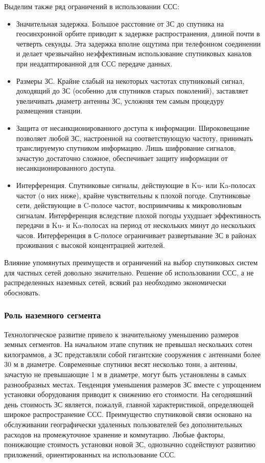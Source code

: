 \documentclass[a4paper]{report}
\begin{document}
Выделим также ряд ограничений в использовании ССС:

\begin{itemize}
\item Значительная задержка. Большое расстояние от ЗС до спутника на геосинхронной орбите приводит к задержке распространения, длиной почти в четверть секунды. Эта задержка вполне ощутима при телефонном соединении и делает чрезвычайно неэффективным использование спутниковых каналов при неадаптированной для ССС передаче данных.
\item Размеры ЗС. Крайне слабый на некоторых частотах спутниковый сигнал, доходящий до ЗС (особенно для спутников старых поколений), заставляет увеличивать диаметр антенны ЗС, усложняя тем самым процедуру размещения станции.
\item Защита от несанкционированного доступа к информации. Широковещание позволяет любой ЗС, настроенной на соответствующую частоту, принимать транслируемую спутником информацию. Лишь шифрование сигналов, зачастую достаточно сложное, обеспечивает защиту информации от несанкционированного доступа.
\item Интерференция. Спутниковые сигналы, действующие в Ku- или Ka-полосах частот (о них ниже), крайне чувствительны к плохой погоде. Спутниковые сети, действующие в C-полосе частот, восприимчивы к микроволновым сигналам. Интерференция вследствие плохой погоды ухудшает эффективность передачи в Ku- и Ka-полосах на период от нескольких минут до нескольких часов. Интерференция в С-полосе ограничивает развертывание ЗС в районах проживания с высокой концентрацией жителей.
\end{itemize}

Влияние упомянутых преимуществ и ограничений на выбор спутниковых систем для частных сетей довольно значительно. Решение об использовании ССС, а не распределенных наземных сетей, всякий раз необходимо экономически обосновать.


\subsubsection{Роль наземного сегмента}
Технологическое развитие привело к значительному уменьшению размеров земных сегментов. На начальном этапе спутник не превышал нескольких сотен килограммов, а ЗС представляли собой гигантские сооружения с антеннами более 30 м в диаметре. Современные спутники весят несколько тонн, а антенны, зачастую не превышающие 1 м в диаметре, могут быть установлены в самых разнообразных местах. Тенденция уменьшения размеров ЗС вместе с упрощением установки оборудования приводит к снижению его стоимости. На сегодняшний день стоимость ЗС является, пожалуй, главной характеристикой, определяющей широкое распространение ССС. Преимущество спутниковой связи основано на обслуживании географически удаленных пользователей без дополнительных расходов на промежуточное хранение и коммутацию. Любые факторы, понижающие стоимость установки новой ЗС, однозначно содействуют развитию приложений, ориентированных на использование ССС.
\end{document}
